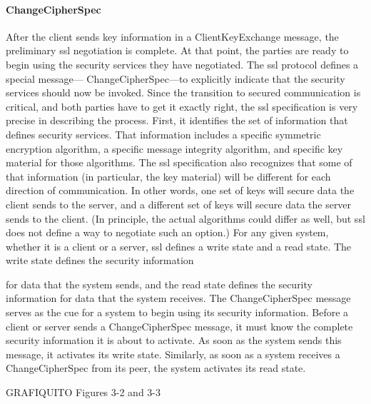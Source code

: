 \paragraph*{ChangeCipherSpec}
After the client sends key information in a ClientKeyExchange message, 
the preliminary ssl negotiation is complete. At that point, the
parties are ready to begin using the security services they have negotiated.
 The ssl protocol defines a special message—
ChangeCipherSpec—to explicitly indicate that the security services
should now be invoked.
Since the transition to secured communication is critical, and both
parties have to get it exactly right, the ssl specification is very precise
in describing the process. First, it identifies the set of information
that defines security services. That information includes a specific
symmetric encryption algorithm, a specific message integrity algorithm, 
and specific key material for those algorithms. The ssl specification also 
recognizes that some of that information (in particular,
the key material) will be different for each direction of communication. 
In other words, one set of keys will secure data the client sends
to the server, and a different set of keys will secure data the server
sends to the client. (In principle, the actual algorithms could differ as
well, but ssl does not define a way to negotiate such an option.) For
any given system, whether it is a client or a server, ssl defines a write
state and a read state. The write state defines the security information

for data that the system sends, and the read state defines the security
information for data that the system receives.
The ChangeCipherSpec message serves as the cue for a system to
begin using its security information. Before a client or server sends a
ChangeCipherSpec message, it must know the complete security information it 
is about to activate. As soon as the system sends this
message, it activates its write state. Similarly, as soon as a system receives
 a ChangeCipherSpec from its peer, the system activates its
read state.

GRAFIQUITO Figures 3-2 and 3-3

